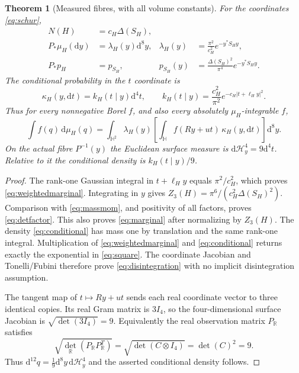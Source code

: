 \documentclass[11pt,a4paper]{article}
\numberwithin{equation}{section}
\newtheorem{theorem}{Theorem}[section]
\theoremstyle{definition}
\theoremstyle{remark}
\newcommand{\HH}{\mathbb H}
\newcommand{\RR}{\mathbb R}
\newcommand{\dd}{\,\mathrm d}
\newcommand{\Ntwo}{\Delta}
\begin{document}
\begin{theorem}[Measured fibres, with all volume constants]\label{thm:disintegration}
For the coordinates \eqref{eq:schur},
\begin{align}
N(H)&=c_H\Ntwo(S_H),\label{eq:detfactor}\\
P_*\mu_H(\mathrm dy)&=\lambda_H(y)\mathrm d^8y,
&\lambda_H(y)&=\frac{\pi^2}{c_H^2}e^{-y^*S_Hy},\label{eq:weightedmarginal}\\
P_*p_H&=p_{S_H},&
p_{S_H}(y)&=\frac{\Ntwo(S_H)^2}{\pi^4}e^{-y^*S_Hy}.
\label{eq:marginal}
\end{align}
The conditional probability in the $t$ coordinate is
\begin{equation}\label{eq:conditional}
\kappa_H(y,\mathrm dt)=k_H(t\mid y)\mathrm d^4t,
\qquad k_H(t\mid y)=\frac{c_H^2}{\pi^2}e^{-c_H|t+\ell_Hy|^2}.
\end{equation}
Thus for every nonnegative Borel $f$, and also every absolutely
$\mu_H$-integrable $f$,
\begin{equation}\label{eq:disintegration}
\int f(q)\dd\mu_H(q)
=\int_{\HH^2}\lambda_H(y)
 \left[\int_{\HH}f(Ry+ut)\,\kappa_H(y,\mathrm dt)\right]\mathrm d^8y.
\end{equation}
On the actual fibre $P^{-1}(y)$ the Euclidean surface measure is
$\mathrm d\mathcal H_y^4=9\mathrm d^4t$. Relative to it the conditional
density is $k_H(t\mid y)/9$.
\end{theorem}
\begin{proof}
The rank-one Gaussian integral in $t+\ell_Hy$ equals $\pi^2/c_H^2$,
which proves \eqref{eq:weightedmarginal}. Integrating in $y$ gives
$Z_3(H)=\pi^6/(c_H^2\Ntwo(S_H)^2)$. Comparison with
\eqref{eq:massmom}, and positivity of all factors, proves
\eqref{eq:detfactor}. This also proves \eqref{eq:marginal} after
normalizing by $Z_3(H)$. The density \eqref{eq:conditional} has mass one
by translation and the same rank-one integral. Multiplication of
\eqref{eq:weightedmarginal} and \eqref{eq:conditional} returns exactly
the exponential in \eqref{eq:square}. The coordinate Jacobian and
Tonelli/Fubini therefore prove \eqref{eq:disintegration} with no implicit
disintegration assumption.

The tangent map of $t\mapsto Ry+ut$ sends each real coordinate vector
to three identical copies. Its real Gram matrix is $3I_4$, so the
four-dimensional surface Jacobian is $\sqrt{\det(3I_4)}=9$.
Equivalently the real observation matrix $P_{\RR}$ satisfies
\[
\sqrt{\det_{\RR}(P_{\RR}P_{\RR}^T)}
=\sqrt{\det(C\otimes I_4)}=\det(C)^2=9.
\]
Thus $\mathrm d^{12}q=\tfrac19\mathrm d^8y\,\mathrm d\mathcal H_y^4$
and the asserted conditional density follows.
\end{proof}
\end{document}
